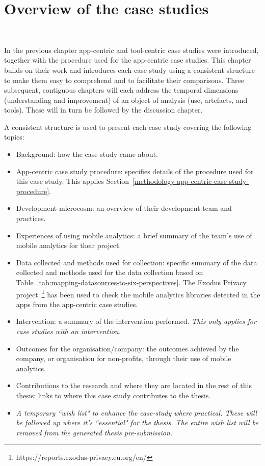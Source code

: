 \chapter{Overview of the case studies}~\label{chapter-case-studies-overview}

In the previous chapter app-centric and tool-centric case studies were introduced, together with the procedure used for the app-centric case studies. This chapter builds on their work and introduces each case study using a consistent structure to make them easy to comprehend and to facilitate their comparisons. Three subsequent, contiguous chapters will each address the temporal dimensions (understanding and improvement) of an object of analysis (use, artefacts, and tools). These will in turn be followed by the discussion chapter.

A consistent structure is used to present each case study covering the following topics:
\begin{itemize}
    \itemsep0em
    \item Background: how the case study came about.
    \item App-centric case study procedure: specifies details of the procedure used for this case study. This applies Section~\ref{methodology-app-centric-case-study-procedure}.
    \item Development microcosm: an overview of their development team and practices.
    \item Experiences of using mobile analytics: a brief summary of the team's use of mobile analytics for their project.
    \item Data collected and methods used for collection: specific summary of the data collected and methods used for the data collection based on Table~\ref{tab:mapping-datasources-to-six-perspectives}. The Exodus Privacy project~\footnote{https://reports.exodus-privacy.eu.org/en/} has been used to check the mobile analytics libraries detected in the apps from the app-centric case studies. 
    \item Intervention: a summary of the intervention performed. \textit{This only applies for case studies with an intervention.}
    \item Outcomes for the organisation/company: the outcomes achieved by the company, or organisation for non-profits, through their use of mobile analytics.
    \item Contributions to the research and where they are located in the rest of this thesis: links to where this case study contributes to the thesis.
    \item \textit{A temporary ``wish list" to enhance the case-study where practical. These will be followed up where it's ``essential" for the thesis. The entire wish list will be removed from the generated thesis pre-submission.}
\end{itemize}



